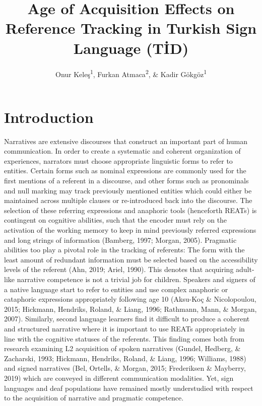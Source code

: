 \documentclass[
  english,
  doc,mask]{apa6}
\title{Age of Acquisition Effects on Reference Tracking in Turkish Sign Language (TİD)}
\author{Onur Keleş\textsuperscript{1}, Furkan Atmaca\textsuperscript{2}, \& Kadir Gökgöz\textsuperscript{1}}
\date{}
\affiliation{\vspace{0.5cm}\textsuperscript{1} Boğaziçi University\\\textsuperscript{2} Leipzig University}
\begin{document}
\maketitle

\hypertarget{introduction}{%
\section{Introduction}\label{introduction}}

Narratives are extensive discourses that construct an important part of human communication. In order to create a systematic and coherent organization of experiences, narrators must choose appropriate linguistic forms to refer to entities. Certain forms such as nominal expressions are commonly used for the first mentions of a referent in a discourse, and other forms such as pronominals and null marking may track previously mentioned entities which could either be maintained across multiple clauses or re-introduced back into the discourse. The selection of these referring expressions and anaphoric tools (henceforth REATs) is contingent on cognitive abilities, such that the encoder must rely on the activation of the working memory to keep in mind previously referred expressions and long strings of information (Bamberg, 1997; Morgan, 2005). Pragmatic abilities too play a pivotal role in the tracking of referents: The form with the least amount of redundant information must be selected based on the accessibility levels of the referent (Ahn, 2019; Ariel, 1990). This denotes that acquiring adult-like narrative competence is not a trivial job for children. Speakers and signers of a native language start to refer to entities and use complex anaphoric or cataphoric expressions appropriately following age 10 (Aksu-Koç \& Nicolopoulou, 2015; Hickmann, Hendriks, Roland, \& Liang, 1996; Rathmann, Mann, \& Morgan, 2007). Similarly, second language learners find it difficult to produce a coherent and structured narrative where it is important to use REATs appropriately in line with the cognitive statuses of the referents. This finding comes both from research examining L2 acquisition of spoken narratives (Gundel, Hedberg, \& Zacharski, 1993; Hickmann, Hendriks, Roland, \& Liang, 1996; Williams, 1988) and signed narratives (Bel, Ortells, \& Morgan, 2015; Frederiksen \& Mayberry, 2019) which are conveyed in different communication modalities. Yet, sign languages and deaf populations have remained mostly understudied with respect to the acquisition of narrative and pragmatic competence.
\end{document}

